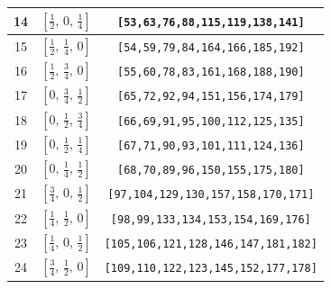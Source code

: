 \documentclass[fleqn,8pt]{jsarticle}
\begin{document}
\begin{longtable}{ccc}
14 & $\left[ \frac{1}{2},\, 0,\, \frac{1}{4} \right]$ & {\tt [53,63,76,88,115,119,138,141]} \\ \hline
15 & $\left[ \frac{1}{2},\, \frac{1}{4},\, 0 \right]$ & {\tt [54,59,79,84,164,166,185,192]} \\ \hline
16 & $\left[ \frac{1}{2},\, \frac{3}{4},\, 0 \right]$ & {\tt [55,60,78,83,161,168,188,190]} \\ \hline
17 & $\left[ 0,\, \frac{3}{4},\, \frac{1}{2} \right]$ & {\tt [65,72,92,94,151,156,174,179]} \\ \hline
18 & $\left[ 0,\, \frac{1}{2},\, \frac{3}{4} \right]$ & {\tt [66,69,91,95,100,112,125,135]} \\ \hline
19 & $\left[ 0,\, \frac{1}{2},\, \frac{1}{4} \right]$ & {\tt [67,71,90,93,101,111,124,136]} \\ \hline
20 & $\left[ 0,\, \frac{1}{4},\, \frac{1}{2} \right]$ & {\tt [68,70,89,96,150,155,175,180]} \\ \hline
21 & $\left[ \frac{3}{4},\, 0,\, \frac{1}{2} \right]$ & {\tt [97,104,129,130,157,158,170,171]} \\ \hline
22 & $\left[ \frac{1}{4},\, \frac{1}{2},\, 0 \right]$ & {\tt [98,99,133,134,153,154,169,176]} \\ \hline
23 & $\left[ \frac{1}{4},\, 0,\, \frac{1}{2} \right]$ & {\tt [105,106,121,128,146,147,181,182]} \\ \hline
24 & $\left[ \frac{3}{4},\, \frac{1}{2},\, 0 \right]$ & {\tt [109,110,122,123,145,152,177,178]} \\
\end{longtable}
\renewcommand{\arraystretch}{1.2}
\end{document}
